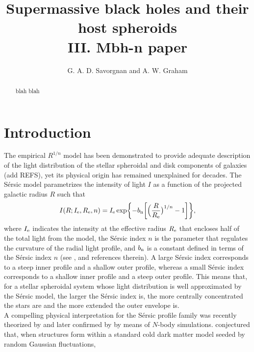 \documentclass[preprint2]{emulateapj}
\begin{document}
\title{Supermassive black holes and their host spheroids \\ III. Mbh-n paper}


\author{G. A. D. Savorgnan and A. W. Graham}


\begin{abstract}
blah blah
\end{abstract}




\section{Introduction}
The empirical \cite{sersic1963,sersic1968} $R^{1/n}$ model has been demonstrated to provide adequate description 
of the light distribution of the stellar spheroidal and disk components of galaxies (add REFS), 
yet its physical origin has remained unexplained for decades. 
The S\'ersic model parametrizes the intensity of light $I$ as a function of the projected galactic radius $R$ such that
\begin{equation}
I(R; I_{\rm e},R_{\rm e},n) = I_{\rm e} \exp \biggl \{ -b_{\rm n} \biggl [ \Bigl (\frac{R}{R_{\rm e}} \bigr )^{1/n} -1 \biggr ] \biggr \}, 
\end{equation}
where $I_{\rm e}$ indicates the intensity at the effective radius $R_{\rm e}$ that encloses half of the total light from the model, 
the S\'ersic index $n$ is the parameter that regulates the curvature of the radial light profile, 
and $b_{\rm n}$ is a constant defined in terms of the S\'ersic index $n$ (see \citealt{grahamdriver2005}, and references therein). 
A large S\'ersic index corresponds to a steep inner profile and a shallow outer profile, 
whereas a small S\'ersic index corresponds to a shallow inner profile and a steep outer profile. 
This means that, for a stellar spheroidal system whose light distribution is well approximated by the S\'ersic model, 
the larger the S\'ersic index is, the more centrally concentrated the stars are and the more extended the outer envelope is. \\
A compelling physical interpretation for the S\'ersic profile family was recently theorized by \cite{cen2014} 
and later confirmed by \cite{nipoti2015} by means of $N$-body simulations. 
\cite{cen2014} conjectured that, when structures form within a standard cold dark matter model seeded by random Gaussian fluctuations, 
\end{document}
